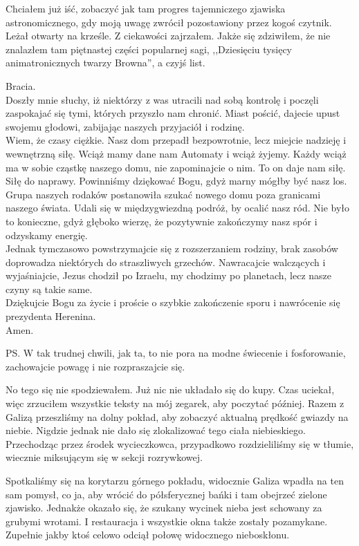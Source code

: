 Chciałem już iść, zobaczyć jak tam progres tajemniczego zjawiska astronomicznego, gdy moją uwagę zwrócił pozostawiony przez kogoś czytnik.
Leżał otwarty na krześle.
Z ciekawości zajrzałem.
Jakże się zdziwiłem, że nie znalazłem tam piętnastej części popularnej sagi, ,,Dziesięciu tysięcy animatronicznych twarzy Browna'', a czyjś list.

\begin{poem}
	Bracia. \\
	Doszły mnie słuchy, iż niektórzy z was utracili nad sobą kontrolę i poczęli zaspokajać się tymi, których przyszło nam chronić.
	Miast pościć, dajecie upust swojemu głodowi, zabijając naszych przyjaciół i rodzinę. \\
	Wiem, że czasy ciężkie. Nasz dom przepadł bezpowrotnie, lecz miejcie nadzieję i wewnętrzną siłę.
	Wciąż mamy dane nam Automaty i wciąż żyjemy.
	Każdy wciąż ma w sobie cząstkę naszego domu, nie zapominajcie o nim. To on daje nam siłę. Siłę do naprawy.
	Powinniśmy dziękować Bogu, gdyż marny mógłby być nasz los.
	\\
	Grupa naszych rodaków postanowiła szukać nowego domu poza granicami naszego świata. Udali się w międzygwiezdną podróż, by ocalić nasz ród.
	Nie było to konieczne, gdyż głęboko wierzę, że pozytywnie zakończymy nasz spór i odzyskamy energię. 
	\\
	Jednak tymczasowo powstrzymajcie się z rozszerzaniem rodziny, brak zasobów doprowadza niektórych do straszliwych grzechów.
	Nawracajcie walczących i wyjaśniajcie, Jezus chodził po Izraelu, my chodzimy po planetach, lecz nasze czyny są takie same.
	\\
	Dziękujcie Bogu za życie i proście o szybkie zakończenie sporu i nawrócenie się prezydenta Herenina. \\
	Amen.
	
	PS. W tak trudnej chwili, jak ta, to nie pora na modne świecenie i fosforowanie, zachowajcie powagę i nie rozpraszajcie się.
\end{poem}

No tego się nie spodziewałem.
Już nic nie układało się do kupy.
Czas uciekał, więc zrzuciłem wszystkie teksty na mój zegarek, aby poczytać później.
Razem z Galizą przeszliśmy na dolny pokład, aby zobaczyć aktualną prędkość gwiazdy na niebie.
Nigdzie jednak nie dało się zlokalizować tego ciała niebieskiego.
Przechodząc przez środek wycieczkowca, przypadkowo rozdzieliliśmy się w tłumie, wiecznie miksującym się w sekcji rozrywkowej.

Spotkaliśmy się na korytarzu górnego pokładu, widocznie Galiza wpadła na ten sam pomysł, co ja, aby wrócić do półsferycznej bańki i tam obejrzeć zielone zjawisko.
Jednakże okazało się, że szukany wycinek nieba jest schowany za grubymi wrotami.
I restauracja i wszystkie okna także zostały pozamykane.
Zupełnie jakby ktoś celowo odciął połowę widocznego nieboskłonu.

